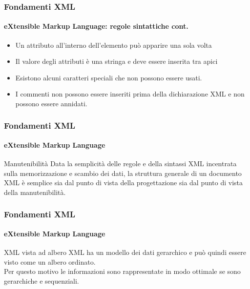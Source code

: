 \begin{frame}
	\frametitle{Fondamenti XML}
	\framesubtitle{eXtensible Markup Language: regole sintattiche cont.}
	\addtocounter{nframe}{1}

	\begin{itemize}
		\item Un attributo all'interno dell'elemento può apparire una sola volta
		
		\item Il valore degli attributi è una stringa e deve essere inserita tra apici

		\item Esistono alcuni caratteri speciali che non possono essere usati. 

		\item I commenti non possono essere inseriti prima della dichiarazione XML e non possono essere annidati.

	\end{itemize}

\end{frame}

\begin{frame}
	\frametitle{Fondamenti XML}
	\framesubtitle{eXtensible Markup Language}
	\addtocounter{nframe}{1}

	\begin{block}{Manutenibilità}
		Data la semplicità delle regole e della sintassi XML incentrata sulla memorizzazione e scambio dei dati, la struttura generale di un documento XML è semplice sia dal punto di vista della progettazione sia dal punto di vista della manutenibilità.
	\end{block}

\end{frame}

\begin{frame}
	\frametitle{Fondamenti XML}
	\framesubtitle{eXtensible Markup Language}
	\addtocounter{nframe}{1}

	\begin{block}{XML vista ad albero}
		XML ha un modello dei dati gerarchico e può quindi essere visto come un albero ordinato.
		\\Per questo motivo le informazioni sono rappresentate in modo ottimale se sono gerarchiche e sequenziali.
	\end{block}

\end{frame}


